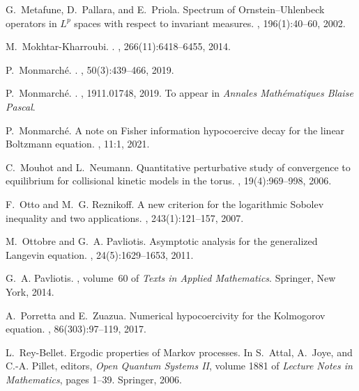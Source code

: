 \documentclass{article}
\begin{document}
\begin{thebibliography}{10}
G.~Metafune, D.~Pallara, and E.~Priola.
\newblock Spectrum of {O}rnstein--{U}hlenbeck operators in {$L^p$} spaces with
  respect to invariant measures.
, 196(1):40--60, 2002.

M.~Mokhtar-Kharroubi.
.
, 266(11):6418--6455, 2014.

P.~Monmarch\'e.
.
, 50(3):439--466, 2019.

P.~Monmarch\'e.
.
, 1911.01748, 2019.
\newblock To appear in \emph{Annales Mathématiques Blaise Pascal}.

P.~Monmarch\'e.
\newblock A note on {F}isher information hypocoercive decay for the linear
  {B}oltzmann equation.
, 11:1, 2021.

C.~Mouhot and L.~Neumann.
\newblock Quantitative perturbative study of convergence to equilibrium for
  collisional kinetic models in the torus.
, 19(4):969--998, 2006.

F.~Otto and M.~G. Reznikoff.
\newblock A new criterion for the logarithmic {S}obolev inequality and two
  applications.
, 243(1):121--157, 2007.

M.~Ottobre and G.~A. Pavliotis.
\newblock Asymptotic analysis for the generalized {L}angevin equation.
, 24(5):1629--1653, 2011.

G.~A. Pavliotis.
, volume~60 of {\em Texts
  in Applied Mathematics}.
\newblock Springer, New York, 2014.

A.~Porretta and E.~Zuazua.
\newblock Numerical hypocoercivity for the {K}olmogorov equation.
, 86(303):97--119, 2017.

L.~Rey-Bellet.
\newblock Ergodic properties of {M}arkov processes.
\newblock In S.~Attal, A.~Joye, and C.-A. Pillet, editors, {\em Open Quantum
  Systems II}, volume 1881 of {\em Lecture Notes in Mathematics}, pages 1--39.
  Springer, 2006.


\end{thebibliography}
\end{document}
